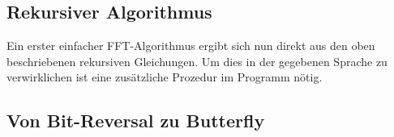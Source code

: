 
		\subsection{Rekursiver Algorithmus} %
		\label{sub:rekursiver_algorithmus}
		
			Ein erster einfacher FFT-Algorithmus ergibt sich nun direkt aus den oben beschriebenen rekursiven Gleichungen.
			Um dies in der gegebenen Sprache zu verwirklichen ist eine zusätzliche Prozedur im Programm nötig.

			\begin{tcolorbox}[colframe=black,colbacktitle=white,coltitle=black, attach boxed title to top center={yshift=-2mm},enhanced, titlerule=0.1pt, boxrule=0.5pt, arc=5pt,title=Listing:\quad rekursiver FFT-Algorithmus]
				
			\end{tcolorbox}



		\newpage

		\subsection{Von Bit-Reversal zu Butterfly} %
		\label{sub:von_bit_reversal_zu_butterfly}
		
